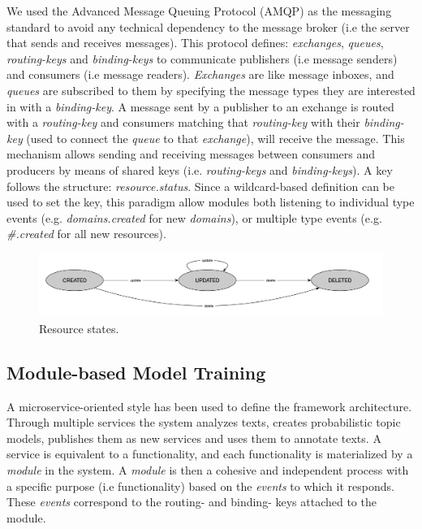 We used the Advanced Message Queuing Protocol (AMQP) as the messaging standard to avoid any technical dependency to the message broker (i.e the server that sends and receives messages). This protocol defines: \textit{exchanges}, \textit{queues}, \textit{routing-keys} and \textit{binding-keys} to communicate publishers (i.e message senders) and consumers (i.e message readers). \textit{Exchanges} are like message inboxes, and \textit{queues} are subscribed to them by specifying the message types they are interested in with a \textit{binding-key}. A message sent by a publisher to an exchange is routed with a \textit{routing-key} and consumers matching that \textit{routing-key} with their \textit{binding-key} (used to connect the \textit{queue} to that \textit{exchange}), will receive the message. This mechanism allows sending and receiving messages between consumers and producers by means of shared keys (i.e. \textit{routing-keys} and \textit{binding-keys}). A key follows the structure: \textit{resource.status}. Since a wildcard-based definition can be used to set the key, this paradigm allow modules both listening to individual type events (e.g. \textit{domains.created} for new \textit{domains}), or multiple type events (e.g. \textit{\#.created} for all new resources).


\begin{figure}
  \center
  \includegraphics[scale=0.3]{resource-states}
  \caption{Resource states.}
  \label{fig:librairy-states}
\end{figure}


\subsection{Module-based Model Training}

A microservice-oriented style has been used to define the framework architecture. Through multiple services the system analyzes texts, creates probabilistic topic models, publishes them as new services and uses them to annotate texts. A service is equivalent to a functionality, and each functionality is materialized by a \textit{module} in the system. A \textit{module} is then a cohesive and independent process \citep{Dragoni2016} with a specific purpose (i.e functionality) based on the \textit{events} to which it responds. These \textit{events} correspond to the routing- and binding- keys attached to the module.

